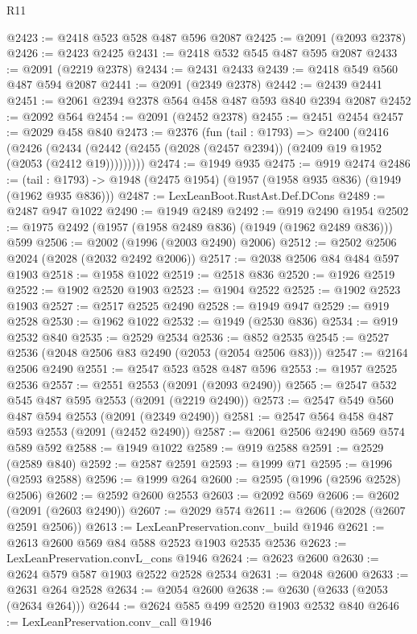 \begin{lexlean}{R11}
\begin{coremodule}
@2423 := @2418 @523 @528 @487 @596 @2087
@2425 := @2091 (@2093 @2378)
@2426 := @2423 @2425
@2431 := @2418 @532 @545 @487 @595 @2087
@2433 := @2091 (@2219 @2378)
@2434 := @2431 @2433
@2439 := @2418 @549 @560 @487 @594 @2087
@2441 := @2091 (@2349 @2378)
@2442 := @2439 @2441
@2451 := @2061 @2394 @2378 @564 @458 @487 @593 @840 @2394 @2087
@2452 := @2092 @564
@2454 := @2091 (@2452 @2378)
@2455 := @2451 @2454
@2457 := @2029 @458 @840
@2473 := @2376
    (fun (tail : @1793) =>
    @2400
      (@2416
        (@2426
          (@2434 (@2442 (@2455 (@2028 (@2457 @2394)) (@2409 @19 @1952 (@2053 (@2412 @19)))))))))
@2474 := @1949 @935
@2475 := @919 @2474
@2486 := (tail : @1793) -> @1948 (@2475 @1954) (@1957 (@1958 @935 @836) (@1949 (@1962 @935 @836)))
@2487 := LexLeanBoot.RustAst.Def.DCons
@2489 := @2487 @947 @1022
@2490 := @1949 @2489
@2492 := @919 @2490 @1954
@2502 := @1975 @2492 (@1957 (@1958 @2489 @836) (@1949 (@1962 @2489 @836))) @599
@2506 := @2002 (@1996 (@2003 @2490) @2006)
@2512 := @2502 @2506 @2024 (@2028 (@2032 @2492 @2006))
@2517 := @2038 @2506 @84 @484 @597 @1903
@2518 := @1958 @1022
@2519 := @2518 @836
@2520 := @1926 @2519
@2522 := @1902 @2520 @1903
@2523 := @1904 @2522
@2525 := @1902 @2523 @1903
@2527 := @2517 @2525 @2490
@2528 := @1949 @947
@2529 := @919 @2528
@2530 := @1962 @1022
@2532 := @1949 (@2530 @836)
@2534 := @919 @2532 @840
@2535 := @2529 @2534
@2536 := @852 @2535
@2545 := @2527 @2536 (@2048 @2506 @83 @2490 (@2053 (@2054 @2506 @83)))
@2547 := @2164 @2506 @2490
@2551 := @2547 @523 @528 @487 @596
@2553 := @1957 @2525 @2536
@2557 := @2551 @2553 (@2091 (@2093 @2490))
@2565 := @2547 @532 @545 @487 @595 @2553 (@2091 (@2219 @2490))
@2573 := @2547 @549 @560 @487 @594 @2553 (@2091 (@2349 @2490))
@2581 := @2547 @564 @458 @487 @593 @2553 (@2091 (@2452 @2490))
@2587 := @2061 @2506 @2490 @569 @574 @589 @592
@2588 := @1949 @1022
@2589 := @919 @2588
@2591 := @2529 (@2589 @840)
@2592 := @2587 @2591
@2593 := @1999 @71
@2595 := @1996 (@2593 @2588)
@2596 := @1999 @264
@2600 := @2595 (@1996 (@2596 @2528) @2506)
@2602 := @2592 @2600 @2553
@2603 := @2092 @569
@2606 := @2602 (@2091 (@2603 @2490))
@2607 := @2029 @574
@2611 := @2606 (@2028 (@2607 @2591 @2506))
@2613 := LexLeanPreservation.conv_build @1946
@2621 := @2613 @2600 @569 @84 @588 @2523 @1903 @2535 @2536
@2623 := LexLeanPreservation.convL_cons @1946
@2624 := @2623 @2600
@2630 := @2624 @579 @587 @1903 @2522 @2528 @2534
@2631 := @2048 @2600
@2633 := @2631 @264 @2528
@2634 := @2054 @2600
@2638 := @2630 (@2633 (@2053 (@2634 @264)))
@2644 := @2624 @585 @499 @2520 @1903 @2532 @840
@2646 := LexLeanPreservation.conv_call @1946

\end{coremodule}
\end{lexlean}

